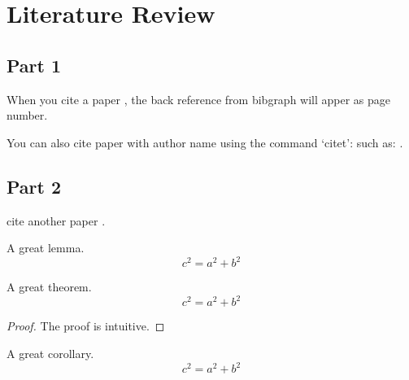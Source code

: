 
\chapter{Literature Review} %
\label{ch:literature_review} %


\section{Part 1}

When you cite a paper \cite{bardeen1957theory}, the back reference from bibgraph will apper as page number.

You can also cite paper with author name using the command `citet': such as: \citet{bardeen1957theory}.

\section{Part 2}

cite another paper \cite{novoselov2005two}.

\begin{lemma}[My lemma]
	A great lemma.
	\begin{equation}
		c^2=a^2+b^2
	\end{equation}
\end{lemma}

\begin{theorem}[My theorem]
	A great theorem.
	\begin{equation}
		c^2=a^2+b^2
	\end{equation}
\end{theorem}

\begin{proof}
	The proof is intuitive.
\end{proof}

\begin{corollary}[My corollary]
	A great corollary.
	\begin{equation}
		c^2=a^2+b^2
	\end{equation}
\end{corollary}

